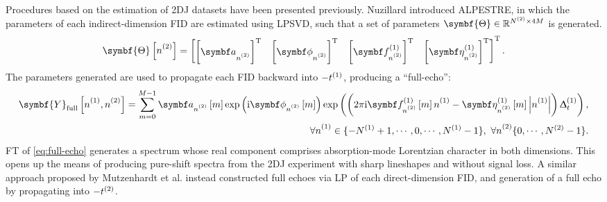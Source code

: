 Procedures based on the estimation of \ac{2DJ} datasets have been
presented previously. Nuzillard introduced
\ac{ALPESTRE}\cite{Nuzillard1996,Martinez2012}, in which
the parameters of each indirect-dimension FID are estimated using \ac{LPSVD},
such that a set of parameters $\symbf{\Theta} \in \mathbb{R}^{\Ntwo
\times 4M}$ is generated.
\begin{equation}
    \symbf{\Theta}\left[\ntwo\right] =
    \begin{bmatrix}
        \left[\bda^{\vphantom{(1)}}_{\ntwo}\right]\T &
        \left[\bdphi^{\vphantom{(1)}}_{\ntwo}\right]\T &
        \left[\bdfone_{\ntwo}\right]\T &
        \left[\bdetaone_{\ntwo}\right]\T
    \end{bmatrix}\T.
\end{equation}
The parameters generated are used to propagate each FID backward into
$-t^{(1)}$, producing a ``full-echo'':
\begin{equation}
    \begin{split}
        \symbf{Y}_{\text{full}}\left[\none, \ntwo\right] = \sum_{m=0}^{M-1}
            \bda_{\ntwo} \left[ m \right]
            \exp\left(\iu \bdphi_{\ntwo} \left[ m \right] \right)
            \exp\left(\left(2 \pi \iu \bdfone_{\ntwo} \left[ m \right] \none
            -\bdetaone_{\ntwo} \left[ m \right] \left\lvert \none \right\rvert \right)\Dtone\right), \\
        \forall \none \in \lbrace -\None + 1, \cdots, 0, \cdots, \None - 1 \rbrace,\ \forall \ntwo \lbrace 0, \cdots, \Ntwo - 1 \rbrace.
    \end{split}
    \label{eq:full-echo}
\end{equation}
\ac{FT} of \eqref{eq:full-echo} generates a spectrum whose real component comprises absorption-mode
Lorentzian character in both dimensions. This opens up the means of producing
pure-shift spectra from the \ac{2DJ} experiment with sharp lineshapes and
without signal loss. A similar approach proposed by Mutzenhardt et al.
instead constructed full echoes via \ac{LP} of each direct-dimension
\ac{FID}, and generation of a full echo by propagating
into $-t^{(2)}$\cite{Mutzenhardt1999}.



